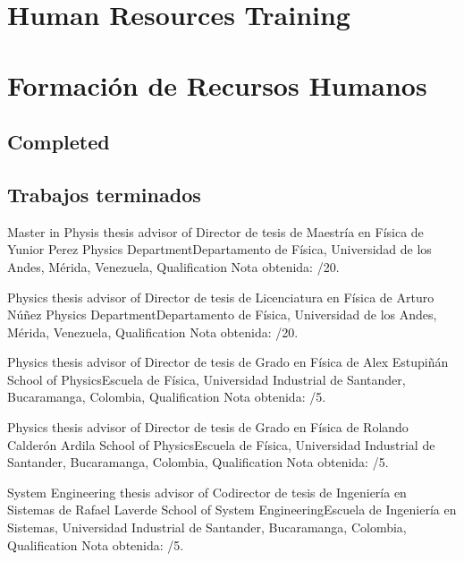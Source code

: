 \ifeng
\section*{Human Resources Training}
\else
\section*{Formación de Recursos Humanos}
\fi


\ifeng
\subsection*{Completed}
\else
\subsection*{Trabajos terminados}
\fi

\ifeng
Master in Physis thesis advisor of
\else
Director de tesis de Maestría en Física de
\fi
Yunior Perez \at \ifeng Physics Department\else Departamento de Física\fi, Universidad de los Andes, Mérida, Venezuela, \ifeng Qualification \else Nota obtenida: /20.

\ifeng
Physics thesis advisor of
\else
Director de tesis de Licenciatura en Física de
\fi
Arturo Núñez \at \ifeng Physics Department\else Departamento de Física\fi, Universidad de los Andes, Mérida, Venezuela, \ifeng Qualification \else Nota obtenida: /20.

\ifeng
Physics thesis advisor of
\else
Director de tesis de Grado en Física de
\fi
Alex Estupiñán \at \ifeng School of Physics\else Escuela de Física\fi, Universidad Industrial de Santander, Bucaramanga, Colombia, \ifeng Qualification \else Nota obtenida: /5.

\ifeng
Physics thesis advisor of
\else
Director de tesis de Grado en Física de
\fi
Rolando Calderón Ardila \at  \ifeng School of Physics\else Escuela de Física\fi, Universidad Industrial de Santander, Bucaramanga, Colombia, \ifeng Qualification \else Nota obtenida: /5. 

\ifeng
System Engineering thesis advisor of
\else
Codirector de tesis de Ingeniería en Sistemas de
\fi
Rafael Laverde \at \ifeng School of System Engineering\else Escuela de Ingeniería en Sistemas\fi, Universidad Industrial de Santander, Bucaramanga, Colombia, \ifeng Qualification \else Nota obtenida: /5.

